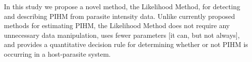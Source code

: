 \documentclass[12pt, a4paper]{article}
\begin{document}





In this study we propose a novel method, the Likelihood Method, for detecting
and describing PIHM from parasite intensity data.  Unlike currently proposed
methods for estimating PIHM, the Likelihood Method does not require any
unnecessary data manipulation, uses fewer parameters [it can, but not always],
and provides a quantitative decision rule for determining whether or not PIHM
is occurring in a host-parasite system.
\end{document}
